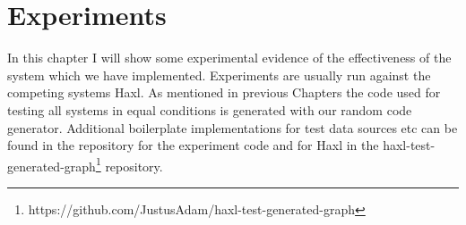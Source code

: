 \chapter{Experiments}

\label{ch:Experiments}

In this chapter I will show some experimental evidence of the effectiveness of the system which we have implemented.
Experiments are usually run against the competing systems Haxl\cite{Haxl:library:link}.
As mentioned in previous Chapters the code used for testing all systems in equal conditions is generated with our random code generator\cite{Goens-rand-code-graph}.
Additional boilerplate implementations for test data sources etc can be found in the \yauhau{} repository\cite{Yauhau:repository:link} for the \yauhau{} experiment code and for Haxl in the haxl-test-generated-graph\footnote{https://github.com/JustusAdam/haxl-test-generated-graph} repository.

%
%
%

